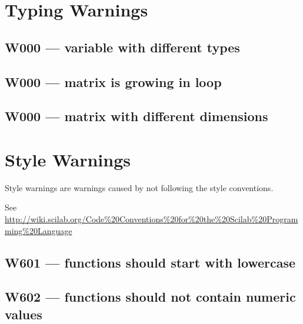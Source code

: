 \section{Typing Warnings}



\subsection{W000 --- variable with different types}




\subsection{W000 --- matrix is growing in loop}




\subsection{W000 --- matrix with different dimensions}




\section{Style Warnings}



Style warnings are warnings caused by not following the style conventions.



See \url{http://wiki.scilab.org/Code%20Conventions%20for%20the%20Scilab%20Programming%20Language}



\subsection{W601 --- functions should start with lowercase}




\subsection{W602 --- functions should not contain numeric values}




